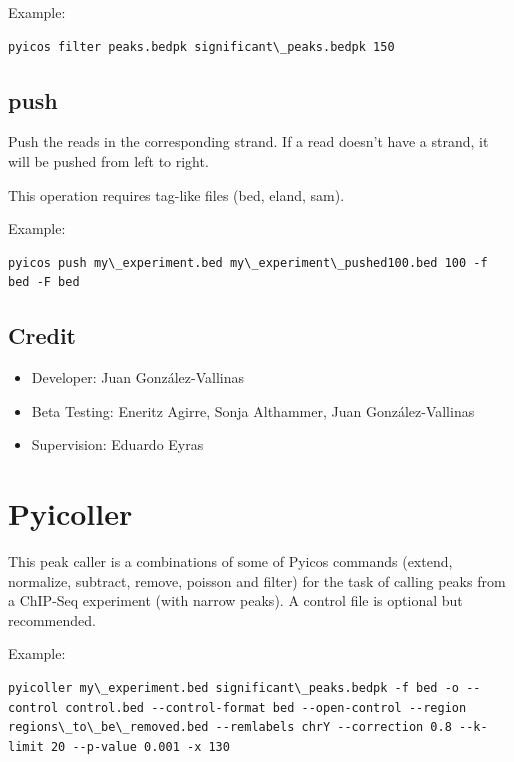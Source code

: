 \documentclass[letterpaper,10pt,english]{sphinxmanual}
\begin{document}
Example:

\begin{Verbatim}[commandchars=\\\{\}]
pyicos filter peaks.bedpk significant\_peaks.bedpk 150
\end{Verbatim}


\subsection{push}
\label{pyicos:push}
Push the reads in the corresponding strand. If a read doesn't have a strand, it will be pushed from left to right.

This operation requires tag-like files (bed, eland, sam).

Example:

\begin{Verbatim}[commandchars=\\\{\}]
pyicos push my\_experiment.bed my\_experiment\_pushed100.bed 100 -f bed -F bed
\end{Verbatim}


\subsection{Credit}
\label{pyicos:credit}\begin{itemize}
\item {} 
Developer: Juan González-Vallinas

\item {} 
Beta Testing: Eneritz Agirre, Sonja Althammer, Juan González-Vallinas

\item {} 
Supervision: Eduardo Eyras

\end{itemize}


\section{Pyicoller}
\label{pyicoller:pyicoller}\label{pyicoller::doc}
This peak caller is a combinations of some of Pyicos commands (extend, normalize, subtract, remove, poisson and filter) for the task of calling peaks from a ChIP-Seq experiment (with narrow peaks). A control file is optional but recommended.

Example:

\begin{Verbatim}[commandchars=\\\{\}]
pyicoller my\_experiment.bed significant\_peaks.bedpk -f bed -o --control control.bed --control-format bed --open-control --region regions\_to\_be\_removed.bed --remlabels chrY --correction 0.8 --k-limit 20 --p-value 0.001 -x 130
\end{Verbatim}
\end{document}
